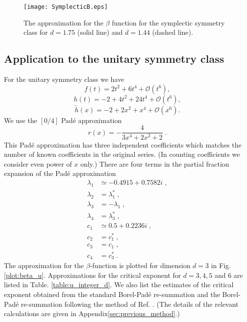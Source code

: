 \documentclass[singlecolumn]{jpsj3}
\begin{document}
\begin{figure}[tb]
\begin{center}
\texttt{[image: SymplecticB.eps]}
\caption{The approximation for the $\beta$ function for the symplectic symmetry class for $d=1.75$ (solid line) and $d=1.44$ (dashed line).}
\label{plot:beta_s_dl}
\end{center}
\end{figure}

\subsection{Application to the unitary symmetry class}
For the unitary symmetry class we have
\begin{equation}
  f(t) = 2t^2 + 6t^4 + \mathcal{O}(t^6),
\end{equation}
\begin{equation}
  h(t) = -2 +4t^2 + 24t^4 + \mathcal{O}(t^6),
\end{equation}
\begin{equation}
  \tilde{h}(x) = -2 + 2x^2 + x^4 +\mathcal{O}(x^6).
\end{equation}
We use the $[0/4]$ Pad\'e approximation
\begin{equation}
  r(x) = -\frac{4}{3x^4+2x^2+2} \;.
\end{equation}
This Pad\'e approximation has three independent coefficients which matches the number of known coefficients in the original series. (In counting coefficients we consider even power of $x$ only.)
There are four terms in the partial fraction expansion of the Pad\'e approximation
\begin{align}
	\lambda_1 &\simeq -0.4915+0.7582i\;, \nonumber \\
	\lambda_2 &= \lambda_1^{*}\;, \nonumber \\
	\lambda_3 &= -\lambda_1\;, \nonumber \\
	\lambda_4 &= \lambda_3^{*}\;, \nonumber \\
	c_1 &\simeq 0.5 + 0.2236i\;, \nonumber \\
	c_2 &= c_1^{*}\;, \nonumber \\
	c_3 &= c_1\;, \nonumber \\
	c_4 &= c_3^{*} \;.
\end{align}
The approximation for the $\beta$-function is plotted for dimension $d=3$ in Fig. \ref{plot:beta_u}.
Approximations for the critical exponent for $d=3,4,5$ and $6$ are listed in Table. \ref{table:u_integer_d}.
We also list the estimates of the critical exponent obtained from the standard Borel-Pad\'e re-summation and the Borel-Pad\'e re-summation following the method of Ref. . (The details of the relevant calculations are given in Appendix\ref{sec:previous_method}.)
\end{document}
